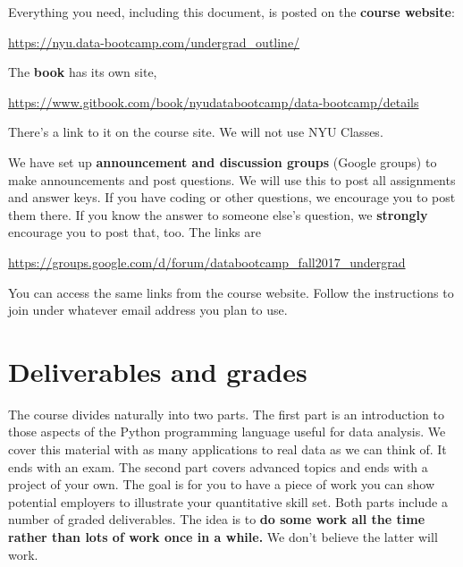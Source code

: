 Everything you need, including this document, is posted on
the {\bf course website\/}:
%
\vspace{-0.15in}
\begin{center}
\url{https://nyu.data-bootcamp.com/undergrad_outline/}
\end{center}
\vspace{-0.15in}
%
The {\bf book\/} has its own site,
\vspace{-0.15in}
\begin{center}
\url{https://www.gitbook.com/book/nyudatabootcamp/data-bootcamp/details}
\end{center}
\vspace{-0.15in}
%
There's a link to it on the course site.
We will not use NYU Classes.

We have set up {\bf announcement and discussion groups\/} (Google groups)
to make announcements and post questions. We will use this to post all assignments and
answer keys.
If you have coding or other questions, we encourage you to post them there.
If you know the answer to someone else's question, we {\bf strongly } encourage you to post that, too.
The links are
\vspace{-0.1in}
\begin{center}
\url{https://groups.google.com/d/forum/databootcamp_fall2017_undergrad} 
\end{center}
\vspace{-0.1in}
You can access the same links from the course website.  Follow the instructions to join under whatever email address you plan to use.


\section*{Deliverables and grades}

The course divides naturally into two parts.
The first part is an introduction to those aspects of the Python programming language
useful for data analysis.
We cover this material with as many applications to real data as we can think of.
It ends with an exam.
The second part covers advanced topics and ends with a project of your own.
The goal is for you to have a piece of work you can show potential employers to
illustrate your quantitative skill set.
Both parts include a number of graded deliverables.
The idea is to {\bf do some work all the time rather than lots of work once in a while.}
We don't believe the latter will work.

